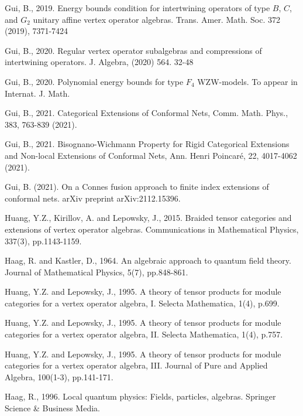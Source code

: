 \documentclass[11pt,b5paper,notitlepage]{article}
\theoremstyle{definition}
\theoremstyle{plain}
\numberwithin{equation}{subsection}
\begin{document}
\begin{thebibliography}{999999}
Gui, B., 2019. Energy bounds condition for intertwining operators of type $ B $, $ C $, and $ G_2 $ unitary affine vertex operator algebras. Trans. Amer. Math. Soc. 372 (2019), 7371-7424



Gui, B., 2020. Regular vertex operator subalgebras and compressions of intertwining operators. J. Algebra, (2020) 564. 32-48

Gui, B., 2020. Polynomial energy bounds for type $F_4$ WZW-models. To appear in Internat. J. Math.

Gui, B., 2021. Categorical Extensions of Conformal Nets, Comm. Math. Phys., 383, 763-839 (2021).

Gui, B., 2021. Bisognano-Wichmann Property for Rigid Categorical Extensions and Non-local Extensions of Conformal Nets, Ann. Henri Poincaré, 22, 4017-4062 (2021).


Gui, B. (2021). On a Connes fusion approach to finite index extensions of conformal nets. arXiv preprint arXiv:2112.15396.

Huang, Y.Z., Kirillov, A. and Lepowsky, J., 2015. Braided tensor categories and extensions of vertex operator algebras. Communications in Mathematical Physics, 337(3), pp.1143-1159.

Haag, R. and Kastler, D., 1964. An algebraic approach to quantum field theory. Journal of Mathematical Physics, 5(7), pp.848-861.





Huang, Y.Z. and Lepowsky, J., 1995. A theory of tensor products for module categories for a vertex operator algebra, I. Selecta Mathematica, 1(4), p.699.

Huang, Y.Z. and Lepowsky, J., 1995. A theory of tensor products for module categories for a vertex operator algebra, II. Selecta Mathematica, 1(4), p.757.

Huang, Y.Z. and Lepowsky, J., 1995. A theory of tensor products for module categories for a vertex operator algebra, III. Journal of Pure and Applied Algebra, 100(1-3), pp.141-171.


Haag, R., 1996. Local quantum physics: Fields, particles, algebras. Springer Science \& Business Media.


\end{thebibliography}
\end{document}
